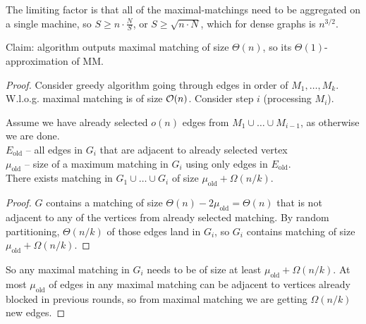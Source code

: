 \documentclass[11pt]{article}
\begin{document}
The limiting factor is that all of the maximal-matchings need to be aggregated on a single machine, so $S \ge n \cdot \frac{N}{S}$, or $S \ge \sqrt{n \cdot N}$, which for dense graphs is $n^{3/2}$.

Claim: algorithm outputs maximal matching of size $\Theta(n)$, so its $\Theta(1)$-approximation of MM.

\begin{proof}
Consider greedy algorithm going through edges in order of $M_1,\ldots,M_k$. W.l.o.g. maximal matching is of size $\mathcal{O}(n)$. Consider step $i$ (processing $M_i$). 

\begin{lemma}
Assume we have already selected $o(n)$ edges from $M_1 \cup \ldots \cup M_{i-1}$, as otherwise we are done.\\
$E_{\text{old}}$ -- all edges in $G_i$ that are adjacent to already selected vertex\\
$\mu_{\text{old}}$ -- size of a maximum matching in $G_i$ using only edges in $E_{\text{old}}$.\\
There exists matching in $G_1 \cup \ldots \cup G_{i}$ of size $\mu_{\text{old}} + \Omega(n/k)$.
\end{lemma}
\begin{proof}
$G$ contains a matching of size $\Theta(n) - 2 \mu_{\text{old}} = \Theta(n)$ that is not adjacent to any of the vertices from already selected matching. By random partitioning, $\Theta(n/k)$ of those edges land in $G_i$, so $G_i$ contains matching of size $\mu_{\text{old}} + \Omega(n/k)$.
\end{proof}


So any maximal matching in $G_i$ needs to be of size at least $\mu_{\text{old}} + \Omega(n/k)$. At most $\mu_{\text{old}}$ of edges in any maximal matching can be adjacent to vertices already blocked in previous rounds, so from maximal matching we are getting $\Omega(n/k)$ new edges.
\end{proof}



\end{document}
